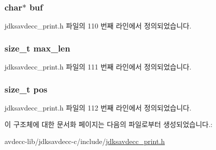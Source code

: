 \subsubsection[{\texorpdfstring{buf}{buf}}]{\setlength{\rightskip}{0pt plus 5cm}char$\ast$ buf}\hypertarget{structjdksavdecc__printer_a1fe855c208bc17a51a4d34fefdb2d5b1}{}\label{structjdksavdecc__printer_a1fe855c208bc17a51a4d34fefdb2d5b1}


jdksavdecc\+\_\+print.\+h 파일의 110 번째 라인에서 정의되었습니다.

\subsubsection[{\texorpdfstring{max\+\_\+len}{max_len}}]{\setlength{\rightskip}{0pt plus 5cm}size\+\_\+t max\+\_\+len}\hypertarget{structjdksavdecc__printer_a956cb5a3c4322e6d67c2f2b21077716c}{}\label{structjdksavdecc__printer_a956cb5a3c4322e6d67c2f2b21077716c}


jdksavdecc\+\_\+print.\+h 파일의 111 번째 라인에서 정의되었습니다.

\subsubsection[{\texorpdfstring{pos}{pos}}]{\setlength{\rightskip}{0pt plus 5cm}size\+\_\+t pos}\hypertarget{structjdksavdecc__printer_a5438a597ee291f523ae04a9fe355924f}{}\label{structjdksavdecc__printer_a5438a597ee291f523ae04a9fe355924f}


jdksavdecc\+\_\+print.\+h 파일의 112 번째 라인에서 정의되었습니다.



이 구조체에 대한 문서화 페이지는 다음의 파일로부터 생성되었습니다.\+:\begin{DoxyCompactItemize}
\item 
avdecc-\/lib/jdksavdecc-\/c/include/\hyperlink{jdksavdecc__print_8h}{jdksavdecc\+\_\+print.\+h}\end{DoxyCompactItemize}
